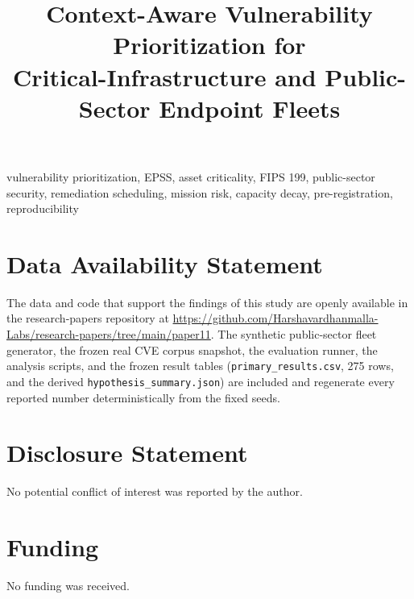 \documentclass[journal]{IEEEtran}
\title{Context-Aware Vulnerability Prioritization for\\Critical-Infrastructure and Public-Sector Endpoint Fleets}
\author{%
  \IEEEauthorblockN{Harshavardhan Malla}
  \IEEEauthorblockA{Independent Researcher\\
  Email: harshavardhanmalla75@gmail.com}%
}
\begin{document}
\maketitle

\begin{abstract}

\end{abstract}

\begin{IEEEkeywords}
vulnerability prioritization, EPSS, asset criticality, FIPS 199, public-sector security,
remediation scheduling, mission risk, capacity decay, pre-registration, reproducibility
\end{IEEEkeywords}













\section*{Data Availability Statement}
The data and code that support the findings of this study are openly
available in the research-papers repository at
\url{https://github.com/Harshavardhanmalla-Labs/research-papers/tree/main/paper11}.
The synthetic public-sector fleet generator, the frozen real CVE corpus
snapshot, the evaluation runner, the analysis scripts, and the frozen
result tables (\texttt{primary\_results.csv}, 275 rows, and the derived
\texttt{hypothesis\_summary.json}) are included and regenerate every
reported number deterministically from the fixed seeds.

\section*{Disclosure Statement}
No potential conflict of interest was reported by the author.

\section*{Funding}
No funding was received.
\end{document}
